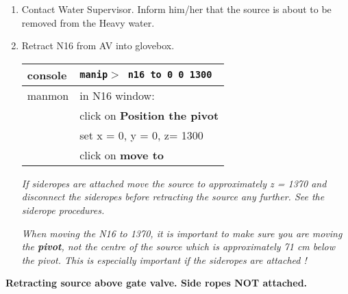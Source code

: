 \begin{enumerate}

\item \checkbox Contact Water Supervisor.  Inform him/her that the source is
   about to be removed from the Heavy water. 

\item \checkbox Retract N16 from AV into glovebox.
  \begin{center}
  \begin{tabular}{|l|l|}
  \hline
  console & {\tt manip$>$ n16 to 0 0 1300} \\
  \hline
  manmon  & in N16 window: \\
          & click on {\bf Position the pivot}\\
          & set x = 0, y = 0, z= 1300\\
          & click on {\bf move to} \\
  \hline
  \end{tabular}
  \end{center}

\small
{\em If sideropes are attached move the source to approximately z = 1370 and
disconnect the sideropes before retracting the source any further. See the
siderope procedures.}


  {\em
    When moving the N16 to 1370, it is important to make sure
    you are moving the {\bf pivot}, not the centre of the source which is
    approximately 71 cm below the pivot.
    This is especially important if the sideropes
    are attached ! 


  }
  \normalsize

  
\end{enumerate}
  
\begin{center}
            {\bf Retracting source above gate valve.  Side ropes NOT attached.}
\end{center}

